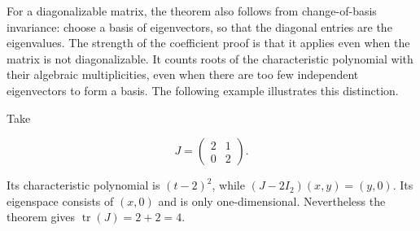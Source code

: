 \label{check-the-statement-on-examples}

For a diagonalizable matrix, the theorem also follows from change-of-basis invariance: choose a basis of eigenvectors, so that the diagonal entries are the eigenvalues. The strength of the coefficient proof is that it applies even when the matrix is not diagonalizable. It counts roots of the characteristic polynomial with their algebraic multiplicities, even when there are too few independent eigenvectors to form a basis. The following example illustrates this distinction.

\begin{example}
Take

\[
J=\begin{pmatrix}2&1\\0&2\end{pmatrix}.
\]

Its characteristic polynomial is $(t-2)^2$, while $(J-2I_2)(x,y)=(y,0)$. Its eigenspace consists of $(x,0)$ and is only one-dimensional. Nevertheless the theorem gives $\operatorname{tr}(J)=2+2=4$.
\end{example}

